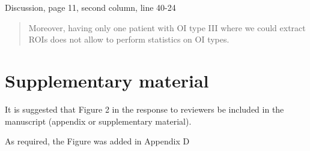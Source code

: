 \documentclass{AR2RC}
\begin{document}
Discussion, page 11, second column, line 40-24
\begin{quote}
	Moreover, having only one patient with OI type III where we could extract ROIs does not allow to perform statistics on OI types. 
\end{quote}

\section{Supplementary material}
\RC It is suggested that Figure 2 in the response to reviewers be included in the manuscript (appendix or supplementary material).

\AR As required, the Figure was added in Appendix D
\end{document}
